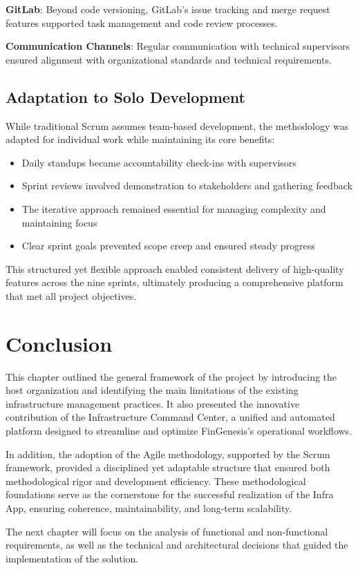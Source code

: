 \textbf{GitLab}: Beyond code versioning, GitLab's issue tracking and merge request features supported task management and code review processes.

\textbf{Communication Channels}: Regular communication with technical supervisors ensured alignment with organizational standards and technical requirements.

\subsection{Adaptation to Solo Development}

While traditional Scrum assumes team-based development, the methodology was adapted for individual work while maintaining its core benefits:

\begin{itemize}
    \item Daily standups became accountability check-ins with supervisors
    \item Sprint reviews involved demonstration to stakeholders and gathering feedback
    \item The iterative approach remained essential for managing complexity and maintaining focus
    \item Clear sprint goals prevented scope creep and ensured steady progress
\end{itemize}

This structured yet flexible approach enabled consistent delivery of high-quality features across the nine sprints, ultimately producing a comprehensive platform that met all project objectives.
\newpage
\section{Conclusion}

\indent This chapter outlined the general framework of the project by introducing the host organization and identifying the main limitations of the existing infrastructure management practices. It also presented the innovative contribution of the Infrastructure Command Center, a unified and automated platform designed to streamline and optimize FinGenesis’s operational workflows.

In addition, the adoption of the Agile methodology, supported by the Scrum framework, provided a disciplined yet adaptable structure that ensured both methodological rigor and development efficiency. These methodological foundations serve as the cornerstone for the successful realization of the Infra App, ensuring coherence, maintainability, and long-term scalability.

The next chapter will focus on the analysis of functional and non-functional requirements, as well as the technical and architectural decisions that guided the implementation of the solution.